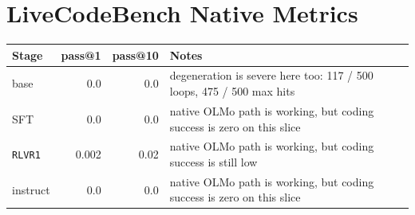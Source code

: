 \documentclass[11pt]{article}
\begin{document}
\section*{LiveCodeBench Native Metrics}
\begin{center}
\small
\setlength{\tabcolsep}{6pt}
\begin{tabular}{@{}lrrl@{}}
\toprule
Stage & pass@1 & pass@10 & Notes \\
\midrule
base & 0.0 & 0.0 & degeneration is severe here too: 117 / 500 loops, 475 / 500 max hits \\
SFT & 0.0 & 0.0 & native OLMo path is working, but coding success is zero on this slice \\
\texttt{RLVR1} & 0.002 & 0.02 & native OLMo path is working, but coding success is still low \\
instruct & 0.0 & 0.0 & native OLMo path is working, but coding success is zero on this slice \\
\bottomrule
\end{tabular}
\end{center}
\end{document}
